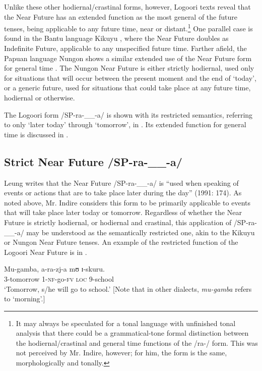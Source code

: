 \documentclass[output=paper]{langsci/langscibook}
\begin{document}
Unlike these other hodiernal/crastinal forms, however, Logoori texts reveal that the Near Future has an extended function as the most general of the future tenses, being applicable to any future time, near or distant.\footnote{ It may always be speculated for a tonal language with unfinished tonal analysis that there could be a grammatical-tone formal distinction between the hodiernal/crastinal and general time functions of the /ra-/ form. This was not perceived by Mr. Indire, however; for him, the form is the same, morphologically and tonally.} One parallel case is found in the Bantu language Kikuyu \citep[19]{Johnson1977}, where the Near Future doubles as Indefinite Future, applicable to any unspecified future time. Farther afield, the Papuan language Nungon shows a similar extended use of the Near Future form for general time \citep{Sarvasy2014}. The Nungon Near Future is either strictly hodiernal, used only for situations that will occur between the present moment and the end of ‘today’, or a generic future, used for situations that could take place at any future time, hodiernal or otherwise. 

The Logoori form /SP-ra-\_\_-a/ is shown with its restricted semantics, referring to only ‘later today’ through ‘tomorrow’, in . Its extended function for general time is discussed in .

\subsection{Strict Near Future /SP-ra-\_\_-a/}
\label{sec:sarvasy:3.1}

Leung writes that the Near Future /SP-ra-\_\_-a/ is “used when speaking of events or actions that are to take place later during the day” (1991: 174). As noted above, Mr. Indire considers this form to be primarily applicable to events that will take place later today or tomorrow. Regardless of whether the Near Future is strictly hodiernal, or hodiernal and crastinal, this application of /SP-ra-\_\_-a/ may be understood as the semantically restricted one, akin to the Kikuyu or Nungon Near Future tenses. An example of the restricted function of the Logoori Near Future is in . 

\ea\label{ex:sarvasy:1}
\gll Mu-gamba,   a-ra-zj-a   mʊ  ɪ{}-skuru. \\
3-tomorrow  1-\textsc{nf}{}-go-\textsc{fv}  \textsc{loc}  9-school \\
\glt ‘Tomorrow, s/he will go to school.’ [Note that in other dialects, \textit{mu-gamba }refers to ‘morning’.] \z
\end{document}
